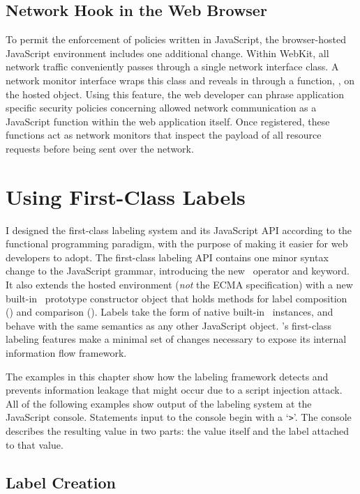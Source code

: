 \subsection{Network Hook in the Web Browser}

To permit the enforcement of policies written in JavaScript, the browser-hosted JavaScript environment includes one additional change.
Within WebKit, all network traffic conveniently passes through a single network interface class.
A network monitor interface wraps this class and reveals in through a function, , on the hosted  object.
Using this feature, the web developer can phrase application specific security policies concerning allowed network communication as a JavaScript function within the web application itself.
Once registered, these functions act as network monitors that inspect the payload of all resource requests before being sent over the network.

\section{Using First-Class Labels}
\label{sec:using-first-class-labels}

I designed the first-class labeling system and its JavaScript API according to the functional programming paradigm, with the purpose of making it easier for web developers to adopt.
The first-class labeling API contains one minor syntax change to the JavaScript grammar, introducing the new \mlabelof\ operator and keyword.
It also extends the hosted environment (\emph{not} the ECMA specification) with a new built-in \FlowLabel\ prototype constructor object that holds methods for label composition (\mjoin) and comparison (\msubsumes).
Labels take the form of native built-in \FlowLabelObject\ instances, and behave with the same semantics as any other JavaScript object.
\FlowCore's first-class labeling features make a minimal set of changes necessary to expose its internal information flow framework.

The examples in this chapter show how the labeling framework detects and prevents information leakage that might occur due to a script injection attack.
All of the following examples show output of the labeling system at the JavaScript console.
Statements input to the console begin with a `\verb|>|'.
The console describes the resulting value in two parts: the value itself and the label attached to that value.

\subsection{Label Creation}

